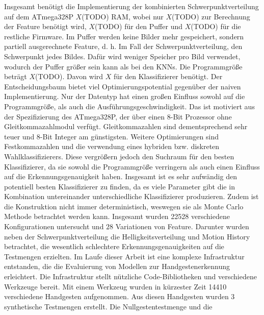 \newline
\newline
Insgesamt benötigt die Implementierung der kombinierten Schwerpunktverteilung auf dem ATmega328P $X$(TODO) RAM, wobei nur $X$(TODO) zur Berechnung der Feature benötigt wird, $X$(TODO) für den Puffer und
$X$(TODO) für die restliche Firmware. Im Puffer werden keine Bilder mehr gespeichert, sondern partiell ausgerechnete Feature, d. h. Im Fall der Schwerpunktverteilung, den Schwerpunkt jedes Bildes.
Dafür wird weniger Speicher pro Bild verwendet, wodurch der Puffer größer sein kann als bei den KNNs. Die Programmgröße beträgt $X$(TODO). Davon wird $X$ für den Klassifizierer benötigt.
\newline
\newline
Der Entscheidungsbaum bietet viel Optimierungspotential gegenüber der naiven Implementierung. Nur der Datentyp hat einen großen Einfluss sowohl auf die Programmgröße, als auch die Ausführungsgeschwindigkeit.
Das ist motiviert aus der Spezifizierung des ATmega328P, der über einen 8-Bit Prozessor ohne Gleitkommazahlmodul verfügt. Gleitkommazahlen sind dementsprechend sehr teuer und 8-Bit Integer am günstigsten.
Weitere Optimierungen sind Festkommazahlen und die verwendung eines hybriden bzw. diskreten Wahlklassifizierers. Diese vergrößern jedoch den Suchraum für den besten Klassifizierer, da sie sowohl die
Programmgröße verringern als auch einen Einfluss auf die Erkennungsgenauigkeit haben.
\newline
\newline
Insgesamt ist es sehr aufwändig den potentiell besten Klassifizierer zu finden, da es viele Parameter gibt die in Kombination untereinander unterschiedliche Klassifizierer produzieren. Zudem ist die
Konstruktion nicht immer deterministisch, weswegen sie als Monte Carlo Methode betrachtet werden kann. Insgesamt wurden 22528 verschiedene Konfigurationen untersucht und $28$ Variationen von Feature.
Darunter wurden neben der Schwerpunktverteilung die Helligkeitsverteilung und Motion History betrachtet, die wesentlich schlechtere Erkennungsgenauigkeiten auf die Testmengen erzielten.
\newline
\newline
Im Laufe dieser Arbeit ist eine komplexe Infrastruktur entstanden, die die Evaluierung von Modellen zur Handgestenerkennung erleichtert. Die Infrastruktur stellt nützliche Code-Bibliotheken und verschiedene
Werkzeuge bereit. Mit einem Werkzeug wurden in kürzester Zeit 14410 verschiedene Handgesten aufgenommen. Aus diesen Handgesten wurden 3 synthetische Testmengen erstellt. Die Nullgestentestmenge und die
